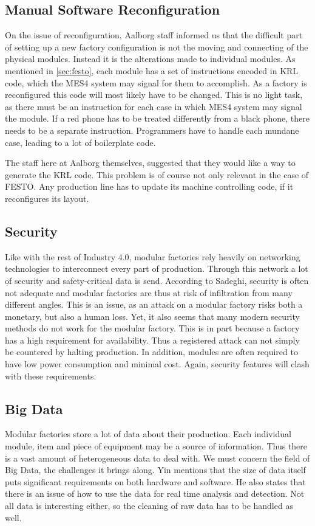 \subsection{Manual Software Reconfiguration}
On the issue of reconfiguration, Aalborg staff informed us that the difficult part of setting up a new factory configuration is not the moving and connecting of the physical modules. Instead it is the alterations made to individual modules. As mentioned in \cref{sec:festo}, each module has a set of instructions encoded in KRL code, which the MES4 system may signal for them to accomplish. As a factory is reconfigured this code will most likely have to be changed. This is no light task, as there must be an instruction for each case in which MES4 system may signal the module. If a red phone has to be treated differently from a black phone, there needs to be a separate instruction. Programmers have to handle each mundane case, leading to a lot of boilerplate code. 

The staff here at Aalborg themselves, suggested that they would like a way to generate the KRL code. This problem is of course not only relevant in the case of FESTO. Any production line has to update its machine controlling code, if it reconfigures its layout.

\subsection{Security}
Like with the rest of Industry 4.0, modular factories rely heavily on networking technologies to interconnect every part of production. Through this network a lot of security and safety-critical data is send. According to Sadeghi\cite{Sadeghi2015}, security is often not adequate and modular factories are thus at risk of infiltration from many different angles. This is an issue, as an attack on a modular factory risks both a monetary, but also a human loss. Yet, it also seems that many modern security methods do not work for the modular factory. This is in part because a factory has a high requirement for availability. Thus a registered attack can not simply be countered by halting production. In addition, modules are often required to have low power consumption and minimal cost. Again, security features will clash with these requirements. 

\subsection{Big Data}
Modular factories store a lot of data about their production. Each individual module, item and piece of equipment may be a source of information. Thus there is a vast amount of heterogeneous data to deal with. We must concern the field of Big Data, the challenges it brings along. Yin \cite{Yin2015} mentions that the size of data itself puts significant requirements on both hardware and software. He also states that there is an issue of how to use the data for real time analysis and detection. Not all data is interesting either, so the cleaning of raw data has to be handled as well. 

